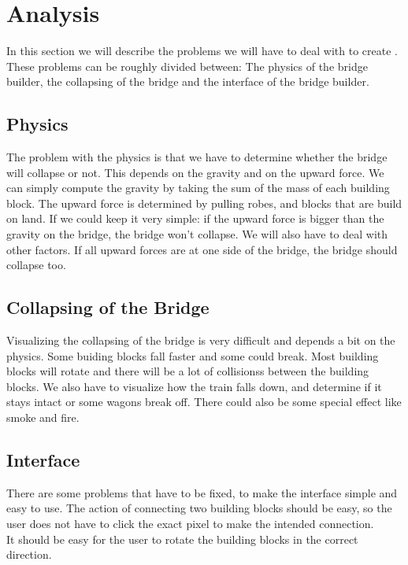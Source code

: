 \section{Analysis}
In this section we will describe the problems we will have to deal with to create \name. These problems can be roughly divided between: The physics of the bridge builder, the collapsing of the bridge and the interface of the bridge builder.
\subsection{Physics}
The problem with the physics is that we have to determine whether the bridge will collapse or not. This depends on the gravity and on the upward force. We can simply compute the gravity by taking the sum of the mass of each building block. The upward force is determined by pulling robes, and blocks that are build on land.  If we could keep it very simple: if the upward force is bigger than the gravity on the bridge, the bridge won't collapse. We will also have to deal with other factors. If all upward forces are at one side of the bridge, the bridge should collapse too. 
\subsection{Collapsing of the Bridge}
Visualizing the collapsing of the bridge is very difficult and depends a bit on the physics. Some buiding blocks fall faster and some could break. Most building blocks will rotate and there will be a lot of collisionss between the building blocks. We also have to visualize how the train falls down, and determine if it stays intact or some wagons break off. There could also be some special effect like smoke and fire. 
\subsection{Interface}
There are some problems that have to be fixed, to make the interface simple and easy to use. The action of connecting two building blocks should be easy, so the user does not have to click the exact pixel to make the intended connection. \\
It should be easy for the user to rotate the building blocks in the correct direction. \\
